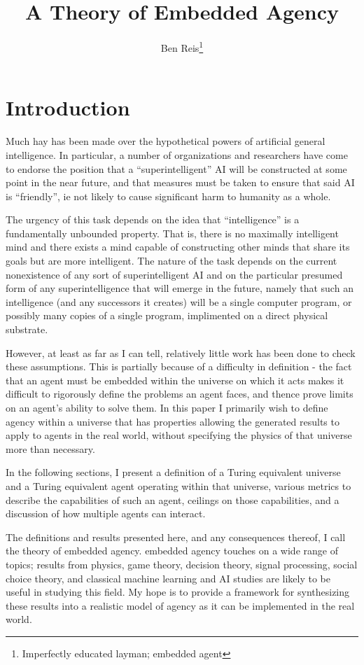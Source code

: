 \documentclass[12pt]{article}
\theoremstyle{definition}
\begin{document}
\title{A Theory of Embedded Agency}
\author{Ben Reis\footnote{Imperfectly educated layman; embedded agent}}
\maketitle

\section{Introduction}
Much hay has been made over the hypothetical powers of artificial general
intelligence. In particular, a number of organizations and researchers have come
to endorse the position that a ``superintelligent'' AI will be constructed at
some point in the near future, and that measures must be taken to ensure that
said AI is ``friendly'', ie not likely to cause significant harm to humanity as
a whole.

The urgency of this task depends on the idea that ``intelligence'' is a
fundamentally unbounded property. That is, there is no maximally intelligent
mind and there exists a mind capable of constructing other minds that share its
goals but are more intelligent. The nature of the task depends on the current
nonexistence of any sort of superintelligent AI and on the particular presumed
form of any superintelligence that will emerge in the future, namely that such
an intelligence (and any successors it creates) will be a single computer
program, or possibly many copies of a single program, implimented on a direct
physical substrate.

However, at least as far as I can tell, relatively little work has been done to
check these assumptions. This is partially because of a difficulty in definition
- the fact that an agent must be embedded within the universe on which it acts
makes it difficult to rigorously define the problems an agent faces, and thence
prove limits on an agent's ability to solve them. In this paper I primarily wish
to define agency within a universe that has properties allowing the generated
results to apply to agents in the real world, without specifying the physics of
that universe more than necessary.

In the following sections, I present a definition of a Turing equivalent
universe and a Turing equivalent agent operating within that universe, various
metrics to describe the capabilities of such an agent, ceilings on those
capabilities, and a discussion of how multiple agents can interact.

The definitions and results presented here, and any consequences thereof, I call
the theory of embedded agency. embedded agency touches on a wide range of
topics; results from physics, game theory, decision theory, signal processing,
social choice theory, and classical machine learning and AI studies are likely
to be useful in studying this field. My hope is to provide a framework for
synthesizing these results into a realistic model of agency as it can be
implemented in the real world.
\end{document}
